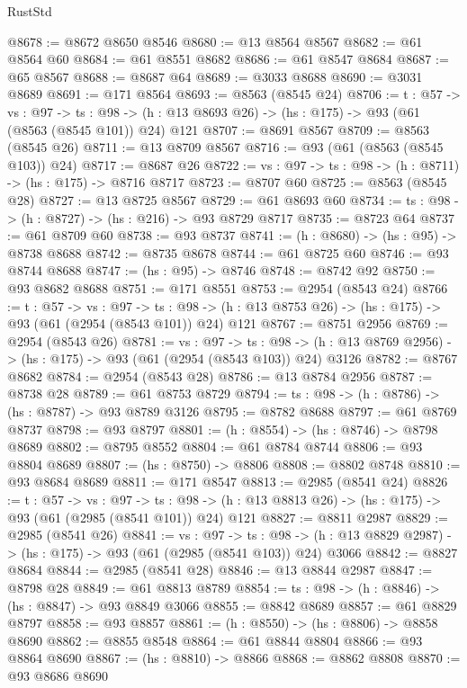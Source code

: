 \begin{lexlean}{RustStd}
\begin{coremodule}
@8678 := @8672 @8650 @8546
@8680 := @13 @8564 @8567
@8682 := @61 @8564 @60
@8684 := @61 @8551 @8682
@8686 := @61 @8547 @8684
@8687 := @65 @8567
@8688 := @8687 @64
@8689 := @3033 @8688
@8690 := @3031 @8689
@8691 := @171 @8564
@8693 := @8563 (@8545 @24)
@8706 := {t : @57} ->
  {vs : @97} ->
  {ts : @98} -> (h : @13 @8693 @26) -> (hs : @175) -> @93 (@61 (@8563 (@8545 @101)) @24) @121
@8707 := @8691 @8567
@8709 := @8563 (@8545 @26)
@8711 := @13 @8709 @8567
@8716 := @93 (@61 (@8563 (@8545 @103)) @24)
@8717 := @8687 @26
@8722 := {vs : @97} -> {ts : @98} -> (h : @8711) -> (hs : @175) -> @8716 @8717
@8723 := @8707 @60
@8725 := @8563 (@8545 @28)
@8727 := @13 @8725 @8567
@8729 := @61 @8693 @60
@8734 := {ts : @98} -> (h : @8727) -> (hs : @216) -> @93 @8729 @8717
@8735 := @8723 @64
@8737 := @61 @8709 @60
@8738 := @93 @8737
@8741 := (h : @8680) -> (hs : @95) -> @8738 @8688
@8742 := @8735 @8678
@8744 := @61 @8725 @60
@8746 := @93 @8744 @8688
@8747 := (hs : @95) -> @8746
@8748 := @8742 @92
@8750 := @93 @8682 @8688
@8751 := @171 @8551
@8753 := @2954 (@8543 @24)
@8766 := {t : @57} ->
  {vs : @97} ->
  {ts : @98} -> (h : @13 @8753 @26) -> (hs : @175) -> @93 (@61 (@2954 (@8543 @101)) @24) @121
@8767 := @8751 @2956
@8769 := @2954 (@8543 @26)
@8781 := {vs : @97} ->
  {ts : @98} -> (h : @13 @8769 @2956) -> (hs : @175) -> @93 (@61 (@2954 (@8543 @103)) @24) @3126
@8782 := @8767 @8682
@8784 := @2954 (@8543 @28)
@8786 := @13 @8784 @2956
@8787 := @8738 @28
@8789 := @61 @8753 @8729
@8794 := {ts : @98} -> (h : @8786) -> (hs : @8787) -> @93 @8789 @3126
@8795 := @8782 @8688
@8797 := @61 @8769 @8737
@8798 := @93 @8797
@8801 := (h : @8554) -> (hs : @8746) -> @8798 @8689
@8802 := @8795 @8552
@8804 := @61 @8784 @8744
@8806 := @93 @8804 @8689
@8807 := (hs : @8750) -> @8806
@8808 := @8802 @8748
@8810 := @93 @8684 @8689
@8811 := @171 @8547
@8813 := @2985 (@8541 @24)
@8826 := {t : @57} ->
  {vs : @97} ->
  {ts : @98} -> (h : @13 @8813 @26) -> (hs : @175) -> @93 (@61 (@2985 (@8541 @101)) @24) @121
@8827 := @8811 @2987
@8829 := @2985 (@8541 @26)
@8841 := {vs : @97} ->
  {ts : @98} -> (h : @13 @8829 @2987) -> (hs : @175) -> @93 (@61 (@2985 (@8541 @103)) @24) @3066
@8842 := @8827 @8684
@8844 := @2985 (@8541 @28)
@8846 := @13 @8844 @2987
@8847 := @8798 @28
@8849 := @61 @8813 @8789
@8854 := {ts : @98} -> (h : @8846) -> (hs : @8847) -> @93 @8849 @3066
@8855 := @8842 @8689
@8857 := @61 @8829 @8797
@8858 := @93 @8857
@8861 := (h : @8550) -> (hs : @8806) -> @8858 @8690
@8862 := @8855 @8548
@8864 := @61 @8844 @8804
@8866 := @93 @8864 @8690
@8867 := (hs : @8810) -> @8866
@8868 := @8862 @8808
@8870 := @93 @8686 @8690

\end{coremodule}
\end{lexlean}
